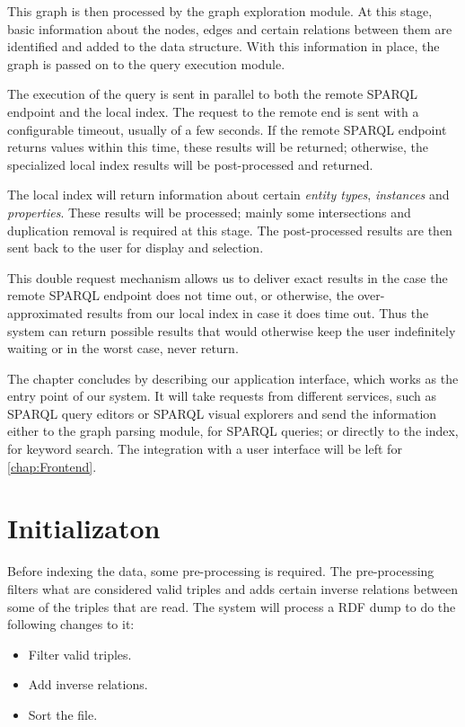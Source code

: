 This graph is then processed by the graph exploration module. 
At this stage, basic information about the nodes, edges and certain relations between them are identified and added to the data structure. 
With this information in place, the graph is passed on to the query execution module. 

The execution of the query is sent in parallel to both the remote SPARQL endpoint and the local index. 
The request to the remote end is sent with a configurable timeout, usually of a few seconds. 
If the remote SPARQL endpoint returns values within this time, these results will be returned; otherwise, the specialized local index results will be post-processed and returned. 

The local index will return information about certain \textit{entity types}, \textit{instances} and \textit{properties}. 
These results will be processed; mainly some intersections and duplication removal is required at this stage.
The post-processed results are then sent back to the user for display and selection.

This double request mechanism allows us to deliver exact results in the case the remote SPARQL endpoint does not time out, or otherwise, the over-approximated results from our local index in case it does time out. 
Thus the system can return possible results that would otherwise keep the user indefinitely waiting or in the worst case, never return. 

The chapter concludes by describing our application interface, which works as the entry point of our system. 
It will take requests from different services, such as SPARQL query editors or SPARQL visual explorers and send the information either to the graph parsing module, for SPARQL queries; 
or directly to the index, for keyword search. 
The integration with a user interface will be left for \autoref{chap:Frontend}.


\section{Initializaton}
\label{chap:init}

Before indexing the data, some pre-processing is required. 
The pre-processing filters what are considered valid triples and adds certain inverse relations between some of the triples that are read. 
The system will process a RDF dump to do the following changes to it:
\begin{itemize}
    \item Filter valid triples.
    \item Add inverse relations.
    \item Sort the file.
\end{itemize}

